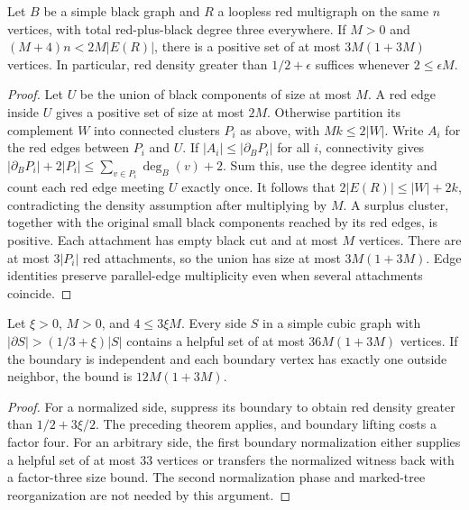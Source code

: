 \begin{theorem}
  \label{thm:lowerbounds-algebraic-cluster-positive}
  \leanok
  Let $B$ be a simple black graph and $R$ a loopless red multigraph on
  the same $n$ vertices, with total red-plus-black degree three everywhere.
  If $M>0$ and $(M+4)n<2M|E(R)|$, there is a positive set of at most
  $3M(1+3M)$ vertices. In particular, red density greater than $1/2+\epsilon$
  suffices whenever $2\le\epsilon M$.
\end{theorem}
\begin{proof}
  \leanok
  Let $U$ be the union of black components of size at most $M$.
  A red edge inside $U$ gives a positive set of size at most $2M$.
  Otherwise partition its complement $W$ into connected clusters $P_i$
  as above, with $Mk\le2|W|$. Write $A_i$ for the red edges between
  $P_i$ and $U$. If $|A_i|\le|\partial_B P_i|$ for all $i$, connectivity
  gives $|\partial_B P_i|+2|P_i|\le\sum_{v\in P_i}\deg_B(v)+2$.
  Sum this, use the degree identity and count each red edge meeting $U$
  exactly once. It follows that $2|E(R)|\le|W|+2k$, contradicting the
  density assumption after multiplying by $M$.
  A surplus cluster, together with the original small black components
  reached by its red edges, is positive. Each attachment has empty black
  cut and at most $M$ vertices. There are at most $3|P_i|$ red attachments,
  so the union has size at most $3M(1+3M)$. Edge identities preserve
  parallel-edge multiplicity even when several attachments coincide.
\end{proof}

\begin{theorem}
  \label{thm:lowerbounds-algebraic-bounded-helpful}
  \leanok
  Let $\xi>0$, $M>0$, and $4\le3\xi M$. Every side $S$ in a simple cubic
  graph with $|\partial S|>(1/3+\xi)|S|$ contains a helpful set of at most
  $36M(1+3M)$ vertices. If the boundary is independent and each boundary
  vertex has exactly one outside neighbor, the bound is $12M(1+3M)$.
\end{theorem}
\begin{proof}
  \leanok
  For a normalized side, suppress its boundary to obtain red density
  greater than $1/2+3\xi/2$. The preceding theorem applies, and boundary
  lifting costs a factor four. For an arbitrary side, the first boundary
  normalization either supplies a helpful set of at most $33$ vertices
  or transfers the normalized witness back with a factor-three size bound.
  The second normalization phase and marked-tree reorganization are not
  needed by this argument.
\end{proof}

